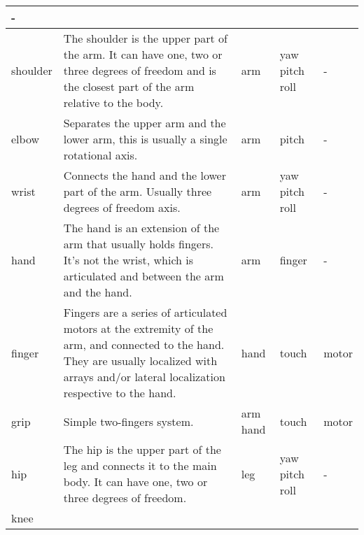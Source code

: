 \documentclass[a4paper]{article}
\begin{document}
\begin{center}
\begin{supertabular}{|m{2.312cm}|m{6.776cm}|m{2.629cm}|m{2.471cm}|m{2.1269999cm}|}
\ttfamily {}-\\\hline
{} shoulder &
\sffamily The shoulder is the upper part of the
arm. It can have one, two or three degrees of freedom and is the
closest part of the arm relative to the body. &
\ttfamily arm &
\ttfamily yaw pitch roll &
\ttfamily {}-\\\hline
{} elbow &
\sffamily Separates the upper arm and the lower
arm, this is usually a single rotational axis. &
\ttfamily arm &
\ttfamily pitch  &
\ttfamily {}-\\\hline
{} wrist &
\sffamily Connects the hand and the lower part
of the arm. Usually three degrees of freedom axis. &
\ttfamily arm &
\ttfamily yaw pitch roll &
\ttfamily {}-\\\hline
{} hand &
\sffamily The hand is an extension of the arm
that usually holds fingers. It’s not the wrist, which is articulated
and between the arm and the hand.  &
\ttfamily arm &
\ttfamily finger &
\ttfamily {}-\\\hline
{} finger &
\sffamily Fingers are a series of articulated
motors at the extremity of the arm, and connected to the hand. They are
usually localized with arrays and/or lateral localization respective to
the hand. &
\ttfamily hand &
\ttfamily touch &
\ttfamily motor\\\hline
{} grip &
\sffamily Simple two-fingers system. &
\ttfamily arm hand &
\ttfamily touch &
\ttfamily motor\\\hline
{} hip &
\sffamily The hip is the upper part of the leg
and connects it to the main body. It can have one, two or three degrees
of freedom. &
\ttfamily leg &
\ttfamily yaw pitch roll &
\ttfamily {}-\\\hline
{} knee &

\end{supertabular}
\end{center}
\end{document}

